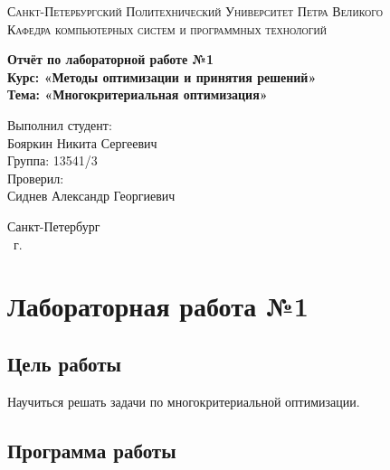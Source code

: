 \documentclass[14pt,a4paper,report]{report}
\begin{document}
\def\contentsname{Содержание}

\begin{titlepage}
	\begin{center}
		\textsc{Санкт-Петербургский Политехнический 
			Университет Петра Великого\\[5mm]
			Кафедра компьютерных систем и программных технологий}
		
		\vfill
		
		\textbf{Отчёт по лабораторной работе №1\\[3mm]
			Курс: «Методы оптимизации и принятия решений»\\[3mm]
			Тема: «Многокритериальная оптимизация»\\[35mm]
			}
	\end{center}
	
	\hfill
	\begin{minipage}{.5\textwidth}
		Выполнил студент:\\[2mm] 
		Бояркин Никита Сергеевич\\
		Группа: 13541/3\\[5mm]
		
		Проверил:\\[2mm] 
		Сиднев Александр Георгиевич
	\end{minipage}
	\vfill
	\begin{center}
		Санкт-Петербург\\ \the\year\ г.
	\end{center}
\end{titlepage}

\tableofcontents
\clearpage

\chapter{Лабораторная работа №1}

\section{Цель работы}

Научиться решать задачи по многокритериальной оптимизации.

\section{Программа работы}
\end{document}
